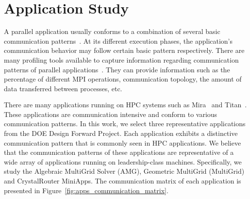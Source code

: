 
\section{Application Study}
\label{sec:application study}


A parallel application usually conforms to a combination of several basic communication patterns~\cite{roth}. 
At its different execution phases, 
the application's communication behavior may follow certain basic pattern respectively. 
There are many profiling tools available to capture 
information regarding communication patterns of parallel applications~\cite{tau,mpip,sst,oxbow}. 
They can provide information such as the percentage of different MPI operations, 
communication topology, the amount of data transferred between processes, etc.

There are many applications running on HPC systems such as Mira~\cite{bgq} and Titan~\cite{titan}. 
These applications are communication intensive and conform to various communication patterns. 
In this work, we select three representative applications from the DOE Design Forward Project. 
Each application exhibits a distinctive communication pattern that is commonly seen in HPC applications. 
We believe that the communication patterns of these applications 
are representative of a wide array of applications running on leadership-class machines. 
Specifically, we study the Algebraic MultiGrid Solver (AMG), 
Geometric MultiGrid (MultiGrid) and CrystalRouter MiniApps. 
The communication matrix of each application is presented in Figure~\ref{fig:apps_communication_matrix}. 


